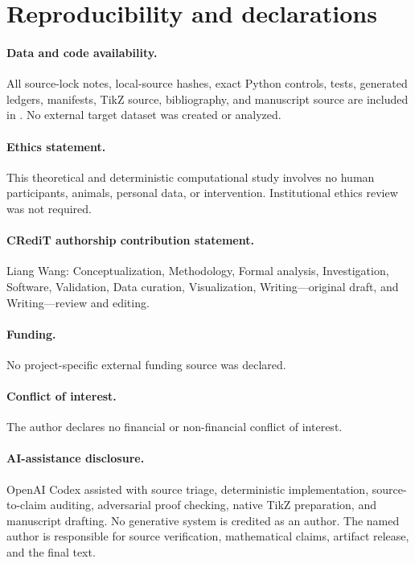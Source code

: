 \documentclass[11pt]{article}
\theoremstyle{remark}\newtheorem{remark}[theorem]{Remark}
\begin{document}
\section*{Reproducibility and declarations}
\paragraph{Data and code availability.}
All source-lock notes, local-source hashes, exact Python controls, tests,
generated ledgers, manifests, TikZ source, bibliography, and manuscript source
are included in .  No external target
dataset was created or analyzed.

\paragraph{Ethics statement.}
This theoretical and deterministic computational study involves no human
participants, animals, personal data, or intervention.  Institutional ethics
review was not required.

\paragraph{CRediT authorship contribution statement.}
Liang Wang: Conceptualization, Methodology, Formal analysis, Investigation,
Software, Validation, Data curation, Visualization, Writing---original draft,
and Writing---review and editing.

\paragraph{Funding.}
No project-specific external funding source was declared.

\paragraph{Conflict of interest.}
The author declares no financial or non-financial conflict of interest.

\paragraph{AI-assistance disclosure.}
OpenAI Codex assisted with source triage, deterministic implementation,
source-to-claim auditing, adversarial proof checking, native TikZ preparation,
and manuscript drafting.  No generative system is credited as an author.  The
named author is responsible for source verification, mathematical claims,
artifact release, and the final text.
\end{document}
